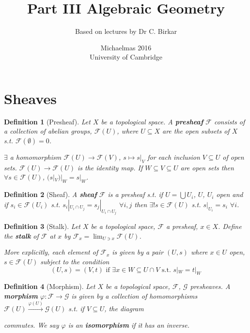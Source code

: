 \documentclass[a4paper]{article}
\title{Part III Algebraic Geometry}
\author{Based on lectures by Dr C. Birkar}
\date{Michaelmas 2016\\University of Cambridge}
\newtheorem*{definition}{Definition}
\begin{document}
\maketitle
\tableofcontents

\section{Sheaves}

\begin{definition}[Presheaf]
	Let $X$ be a topological space. A \textbf{presheaf} $\mathcal{F}$ consists of a collection of abelian groups, $\mathcal{F}(U)$, where $U \subseteq X$ are the open subsets of $X$ s.t. $\mathcal{F}(\emptyset)=0$.
	
	$\exists$ a homomorphism $\mathcal{F}(U)\to\mathcal{F}(V)$, $s \mapsto s|_V$ for each inclusion $V\subseteq U$ of open sets. $\mathcal{F}(U)\to\mathcal{F}(U)$ is the identity map. If $W\subseteq V \subseteq U$ are open sets then $\forall s \in \mathcal{F}(U)$, $(s|_V)|_W=s|_W$.
\end{definition}

\begin{definition}[Sheaf]
	A \textbf{sheaf} $\mathcal{F}$ is a presheaf s.t. if $U=\bigcup U_i$, $U$, $U_i$ open and if $s_i \in \mathcal{F}(U_i)$ s.t. $s_i|_{U_i\cap U_j}=s_j|_{U_i \cap U_j}$ $\forall i,j$ then $\exists ! s\in\mathcal{F}(U)$ s.t. $s|_{U_i}=s_i$ $\forall i$.
\end{definition}

\begin{definition}[Stalk]
	Let $X$ be a topological space, $\mathcal{F}$ a presheaf, $x \in X$. Define the \textbf{stalk} of $\mathcal{F}$ at $x$ by $\mathcal{F}_x = \lim_{U \ni x}\mathcal{F}(U)$.
	
	More explicitly, each element of $\mathcal{F}_x$ is given by a pair $(U, s)$ where $x \in U$ open, $s \in \mathcal{F}(U)$ subject to the condition $$(U,s)=(V,t) \text{ if } \exists x \in W \subseteq U \cap V \text{ s.t. } s|_W=t|_W$$
\end{definition}

\begin{definition}[Morphism]
	Let $X$ be a topological space, $\mathcal{F}$, $\mathcal{G}$ presheaves. A \textbf{morphism} $\varphi: \mathcal{F} \to \mathcal{G}$ is given by a collection of homomorphisms $\mathcal{F}(U)\overset{\varphi(U)}{\to}\mathcal{G}(U)$ s.t. if $V \subseteq U$, the diagram
	\begin{center}

	\end{center}
	
	\noindent commutes. We say $\varphi$ is an \textbf{isomorphism} if it has an inverse.
\end{definition}
\end{document}
